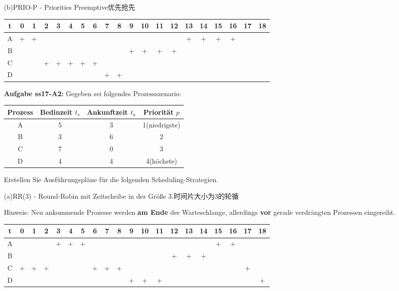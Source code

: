 \documentclass[fleqn]{article}
\begin{document}
\indent (b)PRIO-P - Priorities Preemptive优先抢先

\begin{center}
    \begin{tabular}{|c||c|c|c|c|c|c|c|c|c|c|c|c|c|c|c|c|c|c|c|}
        \hline
        t&0&1&2&3&4&5&6&7&8&9&10&11&12&13&14&15&16&17&18\\
        \hline
        A&+&+&&&&&&&&&&&&+&+&+&+&&\\
        \hline
        B&&&&&&&&&&+&+&+&+&&&&&&\\
        \hline
        C&&&+&+&+&+&+&&&&&&&&&&&&\\
        \hline
        D&&&&&&&&+&+&&&&&&&&&&\\
        \hline
    \end{tabular}
\end{center}

\noindent\textbf{Aufgabe ss17-A2:}
Gegeben sei folgendes Prozessszenario:

\begin{center}
    \begin{tabular}{|c|c|c|c|}
        \hline
        Prozess&Bedinzeit $t_s$&Ankunftzeit $t_a$&Priorität $p$\\
        \hline
        A&5&3&1(niedrigste)\\
        B&3&6&2\\
        C&7&0&3\\
        D&4&4&4(höchste)\\
        \hline
    \end{tabular}
\end{center}

\indent Erstellen Sie Ausführungspläne für die folgenden Scheduling-Strategien.

\indent (a)RR(3) - Round-Robin mit Zeitscheibe in der Größe 3.时间片大小为3的轮循

\indent Hinweis: Neu ankommende Prozesse werden \textbf{am Ende}
 der Warteschlange, allerdings \textbf{vor} gerade verdrängten Prozessen eingereiht.

\begin{center}
    \begin{tabular}{|c||c|c|c|c|c|c|c|c|c|c|c|c|c|c|c|c|c|c|c|}
        \hline
        t&0&1&2&3&4&5&6&7&8&9&10&11&12&13&14&15&16&17&18\\
        \hline
        A&&&&+&+&+&&&&&&&&&&+&+&&\\
        \hline
        B&&&&&&&&&&&&&+&+&+&&&&\\
        \hline
        C&+&+&+&&&&+&+&+&&&&&&&&&+&\\
        \hline
        D&&&&&&&&&&+&+&+&&&&&&&+\\
        \hline
    \end{tabular}
\end{center}
\end{document}
